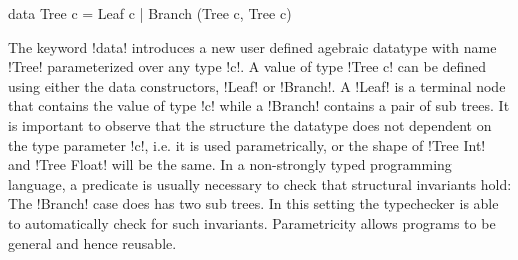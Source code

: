 \documentclass[manuscript,screen,nonacm]{acmart}
\begin{document}
\begin{CenteredBox}
  \begin{code}
      data Tree c = Leaf c | Branch (Tree c, Tree c)
   \end{code}
\end{CenteredBox}
The keyword !data! introduces a new user defined agebraic datatype with name !Tree! parameterized over any type !c!. A value of type !Tree c! can be defined using either the data constructors, !Leaf! or !Branch!. A !Leaf! is a terminal node that contains the value of type !c! while a !Branch! contains a pair of sub trees. It is important to observe that the structure the datatype does not dependent on the type parameter !c!, i.e. it is used parametrically, or the shape of !Tree Int! and !Tree Float! will be the same. In a non-strongly typed programming language, a predicate is usually necessary to check that structural invariants hold: The !Branch! case does has two sub trees. In this setting the typechecker is able to automatically check for such invariants. Parametricity allows programs to be general and hence reusable.
\end{document}
